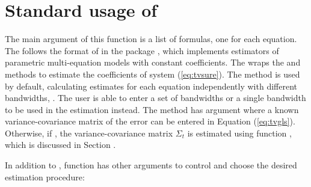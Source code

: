 \section{Standard usage of }
\label{ssec:tvsure}
The main argument of this function is a list of formulas, one for each equation. The  follows the format of  in the package , which implements estimators of parametric multi-equation models with constant coefficients. The  wraps the  and  methods to estimate the coefficients of system (\ref{eq:tvsure}). The  method is used by default, calculating estimates for each equation independently with different bandwidths, . The user is able to enter a set of bandwidths or a single bandwidth to be used in the estimation instead. The  method has argument  where a known variance-covariance matrix of the error can be entered in Equation (\ref{eq:tvgls}). Otherwise, if , the variance-covariance matrix $\Sigma_t$ is estimated using function , which is discussed in Section .

In addition to , function  has other arguments to control and choose the desired estimation procedure:

